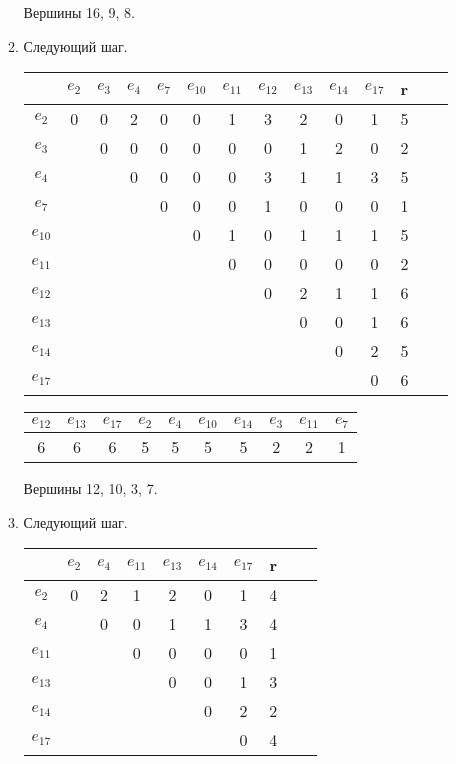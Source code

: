 \documentclass[12pt, a4paper] {ncc}
\begin{document}
\begin{enumerate}
\begin{enumerate}
Вершины 16, 9, 8.

        \item Следующий шаг.

\begin{tabular}{|c|c|c|c|c|c|c|c|c|c|c|c|c|c|}
\hline
      & $e_{2}$ & $e_{3}$ & $e_{4}$ & $e_{7}$ & $e_{10}$ & $e_{11}$ & $e_{12}$ & $e_{13}$ & $e_{14}$ & $e_{17}$ & r \\
\hline
$e_{2}$  &   0 & 0 & 2 &  0 & 0 & 1 & 3 & 2 & 0 & 1 & 5 \\ \hline
$e_{3}$  &     & 0 & 0 &  0 & 0 & 0 & 0 & 1 & 2 & 0 & 2 \\ \hline
$e_{4}$  &     &   & 0 &  0 & 0 & 0 & 3 & 1 & 1 & 3 & 5\\ \hline
$e_{7}$  &     &   &   &  0 & 0 & 0 & 1 & 0 & 0 & 0 & 1\\ \hline
$e_{10}$ &     &   &   &    & 0 & 1 & 0 & 1 & 1 & 1 & 5\\ \hline
$e_{11}$ &     &   &   &    &   & 0 & 0 & 0 & 0 & 0 & 2\\ \hline
$e_{12}$ &     &   &   &    &   &   & 0 & 2 & 1 & 1 & 6\\ \hline
$e_{13}$ &     &   &   &    &   &   &   & 0 & 0 & 1 & 6\\ \hline
$e_{14}$ &     &   &   &    &   &   &   &   & 0 & 2 & 5\\ \hline
$e_{17}$ &     &   &   &    &   &   &   &   &   & 0 & 6\\ \hline
\end{tabular}

\begin{center}
\begin{longtable}{|c c c c c c c c c c|}
\hline
$e_{12}$ & $e_{13}$ & $e_{17}$ & $e_{2}$ & $e_{4}$ & $e_{10}$ & $e_{14}$ & $e_{3}$ & $e_{11}$ & $e_{7}$ \\
\hline
6 & 6 & 6 & 5 & 5 & 5 & 5 & 2 & 2 & 1 \\
\hline
\end{longtable}
\end{center}

Вершины 12, 10, 3, 7.
        \item Следующий шаг.

\begin{tabular}{|c|c|c|c|c|c|c|c|c|c|}
\hline
      & $e_{2}$ & $e_{4}$ & $e_{11}$ & $e_{13}$ & $e_{14}$ & $e_{17}$ & r \\
\hline
$e_{2}$  &   0 &  2 & 1 & 2 & 0 & 1 & 4 \\ \hline
$e_{4}$  &     &  0 & 0 & 1 & 1 & 3 & 4\\ \hline
$e_{11}$ &     &    & 0 & 0 & 0 & 0 & 1\\ \hline
$e_{13}$ &     &    &   & 0 & 0 & 1 & 3\\ \hline
$e_{14}$ &     &    &   &   & 0 & 2 & 2\\ \hline
$e_{17}$ &     &    &   &   &   & 0 & 4\\ \hline
\end{tabular}


\end{enumerate}
\end{enumerate}
\end{document}
